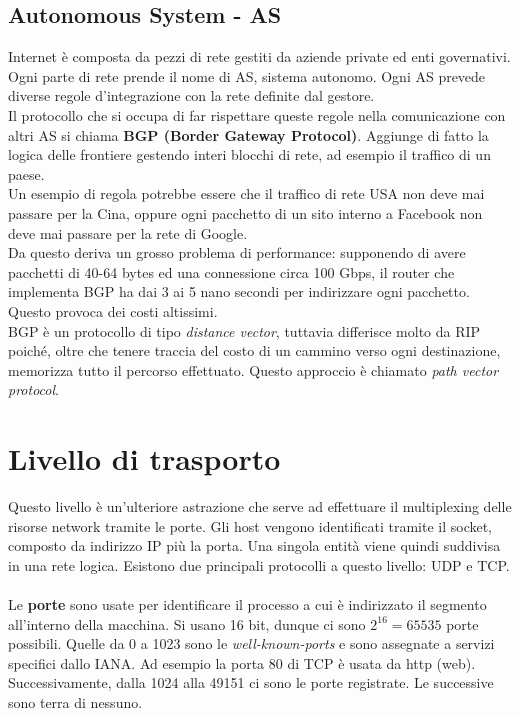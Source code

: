 \documentclass[10pt,a4paper,twoside]{article}
\begin{document}
\subsection{Autonomous System - AS}
Internet è composta da pezzi di rete gestiti da aziende private ed enti governativi. Ogni parte di rete prende il nome di AS, sistema autonomo. Ogni AS prevede diverse regole d'integrazione con la rete definite dal gestore.\\
Il protocollo che si occupa di far rispettare queste regole nella comunicazione con altri AS si chiama \textbf{BGP (Border Gateway Protocol)}. Aggiunge di fatto la logica delle frontiere gestendo interi blocchi di rete, ad esempio il traffico di un paese.\\
Un esempio di regola potrebbe essere che il traffico di rete USA non deve mai passare per la Cina, oppure ogni pacchetto di un sito interno a Facebook non deve mai passare per la rete di Google.\\
Da questo deriva un grosso problema di performance: supponendo di avere pacchetti di 40-64 bytes ed una connessione  circa 100 Gbps, il router che implementa BGP ha dai 3 ai 5 nano secondi per indirizzare ogni pacchetto. Questo provoca dei costi altissimi.\\
BGP è un protocollo di tipo \textit{distance vector}, tuttavia differisce molto da RIP poiché, oltre che tenere traccia del costo di un cammino verso ogni destinazione, memorizza tutto il percorso effettuato. Questo approccio è chiamato \textit{path vector protocol}.

\section{Livello di trasporto}
Questo livello è un'ulteriore astrazione che serve ad effettuare il multiplexing delle risorse network tramite le porte. Gli host vengono identificati tramite il socket, composto da indirizzo IP più la porta. Una singola entità viene quindi suddivisa in una rete logica. Esistono due principali protocolli a questo livello: UDP e TCP.\\\\
Le \textbf{porte} sono usate per identificare il processo a cui è indirizzato il segmento all'interno della macchina. Si usano 16 bit, dunque ci sono $2^{16}=65535$ porte possibili. Quelle da 0 a 1023 sono le \textit{well-known-ports} e sono assegnate a servizi specifici dallo IANA. Ad esempio la porta 80 di TCP è usata da http (web). Successivamente, dalla 1024 alla 49151 ci sono le porte registrate. Le successive sono terra di nessuno.
\end{document}
